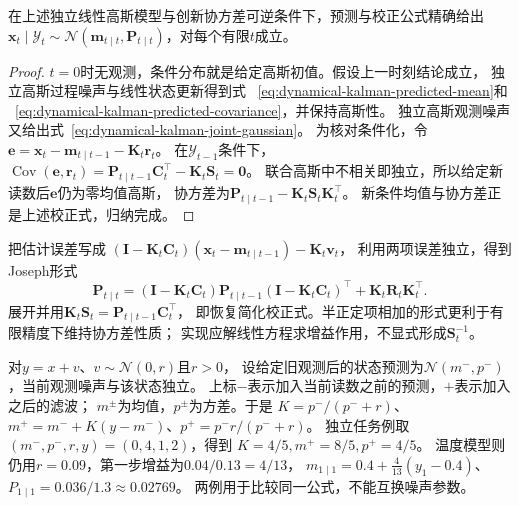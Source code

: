 \begin{theorem}[有限时域Kalman滤波]
 \label{thm:dynamical-finite-horizon-kalman-filter}
 在上述独立线性高斯模型与创新协方差可逆条件下，预测与校正公式精确给出
 $\bm x_t\mid\mathcal Y_t\sim
       \mathcal N(\bm m_{t\mid t},\bm P_{t\mid t})$，对每个有限$t$成立。
\end{theorem}
\begin{proof}
 $t=0$时无观测，条件分布就是给定高斯初值。假设上一时刻结论成立，
 独立高斯过程噪声与线性状态更新得到式
 ~\eqref{eq:dynamical-kalman-predicted-mean}和
 ~\eqref{eq:dynamical-kalman-predicted-covariance}，并保持高斯性。
 独立高斯观测噪声又给出式~\eqref{eq:dynamical-kalman-joint-gaussian}。
 为核对条件化，令$\bm e=\bm x_t-\bm m_{t\mid t-1}-\bm K_t\bm r_t$。
 在$\mathcal Y_{t-1}$条件下，
 $\operatorname{Cov}(\bm e,\bm r_t)
   =\bm P_{t\mid t-1}\bm C_t^\top-\bm K_t\bm S_t=\bm0$。
 联合高斯中不相关即独立，所以给定新读数后$\bm e$仍为零均值高斯，
 协方差为$\bm P_{t\mid t-1}-\bm K_t\bm S_t\bm K_t^\top$。
 新条件均值与协方差正是上述校正式，归纳完成。
\end{proof}

把估计误差写成
$(\bm I-\bm K_t\bm C_t)(\bm x_t-\bm m_{t\mid t-1})-\bm K_t\bm v_t$，
利用两项误差独立，得到Joseph形式
\begin{equation}
 \bm P_{t\mid t}=(\bm I-\bm K_t\bm C_t)\bm P_{t\mid t-1}
                    (\bm I-\bm K_t\bm C_t)^\top+\bm K_t\bm R_t\bm K_t^\top.
 \label{eq:dynamical-kalman-joseph-form}
\end{equation}
展开并用$\bm K_t\bm S_t=\bm P_{t\mid t-1}\bm C_t^\top$，
即恢复简化校正式。半正定项相加的形式更利于有限精度下维持协方差性质；
实现应解线性方程求增益作用，不显式形成$\bm S_t^{-1}$。

\begin{example}[标量观测怎样权衡预测与读数]
 \label{ex:dynamical-scalar-kalman-update}
 对$y=x+v$、$v\sim\mathcal N(0,r)$且$r>0$，
 设给定旧观测后的状态预测为$\mathcal N(m^-,p^-)$，当前观测噪声与该状态独立。
 上标$-$表示加入当前读数之前的预测，$+$表示加入之后的滤波；
 $m^\pm$为均值，$p^\pm$为方差。于是
 $K=p^-/(p^-+r)$、$m^+=m^-+K(y-m^-)$、$p^+=p^-r/(p^-+r)$。
 独立任务例取$(m^-,p^-,r,y)=(0,4,1,2)$，得到
 $K=4/5,m^+=8/5,p^+=4/5$。
 温度模型则仍用$r=0.09$，第一步增益为$0.04/0.13=4/13$，
 $m_{1\mid1}=0.4+\frac4{13}(y_1-0.4)$、
 $P_{1\mid1}=0.036/1.3\approx0.02769$。
 两例用于比较同一公式，不能互换噪声参数。
\end{example}

